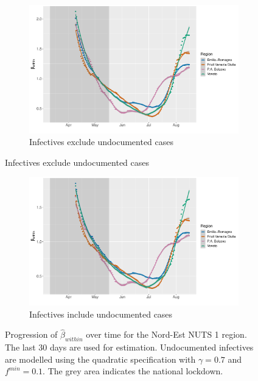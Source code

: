 \documentclass[12pt]{article}
\begin{document}
	\begin{figure}[H]
	    \centering
	    \begin{subfigure}{\textwidth}
	      \centering
	      \includegraphics[width=0.91\linewidth]{output/model_within_lag14_betawithin_Nord-Est_rollingwindow30.pdf}
	      \caption{Infectives exclude undocumented cases}
	      \label{fig:model_within_nordest_lowsample_regular}
	    \end{subfigure}
    \end{figure}
    \begin{figure}[H]\ContinuedFloat
	    \begin{subfigure}{\textwidth}
	      \centering
	      \includegraphics[width=0.91\linewidth]{output/model_within_lag14_betawithin_Nord-Est_UndocQuadratic_rollingwindow30.pdf}
	      \caption{Infectives include undocumented cases}
	      \label{fig:model_within_nordest_lowsample_undoc}
	    \end{subfigure}
	    \caption{Progression of $\widehat{\beta}_{within}$ over time for the Nord-Est NUTS 1 region. The last 30 days are used for estimation. Undocumented infectives are modelled using the quadratic specification with $\gamma = 0.7$ and $f^{min}=0.1$. The grey area indicates the national lockdown.}
	    \label{fig:model_within_nordest_lowsample}
    \end{figure}
	
\end{document}
